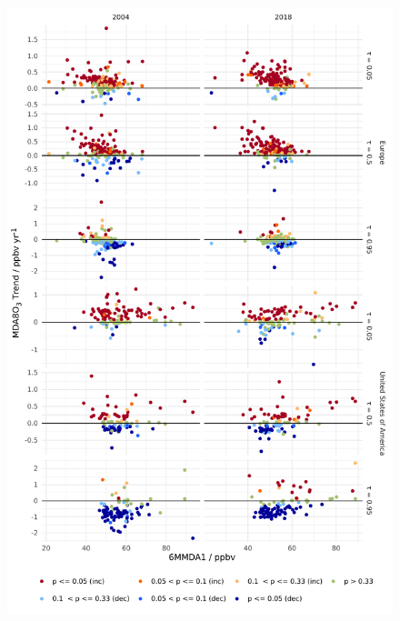 \documentclass{article}
\begin{document}
\begin{figure}[p]
\centering
\includegraphics[height=0.75\textheight]{figures/si_figures/fS22_mda8_sig_mda8_6mmda1.pdf}
\caption{}
\label{si_fig:mda8_sig_mda8_6mmda1}
\end{figure}
\clearpage
\end{document}
